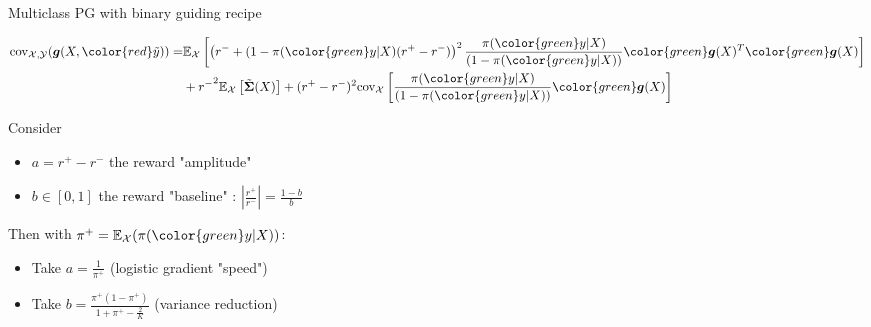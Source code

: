 \documentclass{beamer}
\begin{document}
\begin{frame}{Multiclass PG with binary guiding recipe}

	\begin{tiny}
		\begin{exampleblock}{}
			\begin{align*}
			\text{cov}_{\mathcal{X},\mathcal{Y}}(\boldsymbol{g}(X,{\color{red}\tilde{y}})) 
			=& \mathbb{E}_\mathcal{X} \left[ \left( r^- + (1-\pi({\color{green}y}|X) (r^+ - r^-) \right)^2 
				\frac{\pi({\color{green}y}|X)}{(1-\pi({\color{green}y}|X))} {\color{green}\boldsymbol{g}}(X)^T {\color{green}\boldsymbol{g}}(X)\right]\\
			&+ {r^-}^2 \mathbb{E}_\mathcal{X}\left[\tilde{\boldsymbol{\Sigma}}(X)\right]
			+ (r^+-r^-)^2 \text{cov}_\mathcal{X} \left[\frac{\pi({\color{green}y}|X)}{(1-\pi({\color{green}y}|X))}{\color{green}\boldsymbol{g}}(X)\right]
			\end{align*}
		\end{exampleblock}
	\end{tiny}	

	
Consider
\begin{itemize}
	\item $a = r^+ - r^-$ the reward "amplitude"
	\item $b \in [0,1]$ the reward "baseline" : $\left|\frac{r^+}{r^-}\right| = \frac{1-b}{b}$
\end{itemize}
Then with $\pi^+ = \mathbb{E}_\mathcal{X}(\pi({\color{green}y}|X))$:
\begin{itemize}
	\item Take $a =  \frac{1}{\pi^+}$ (logistic gradient "speed")
	\item Take $b =  \frac{\pi^+(1-\pi^+)}{1+\pi^+ - \frac{2}{K}}$ (variance reduction)
\end{itemize}
\end{frame}
\end{document}
